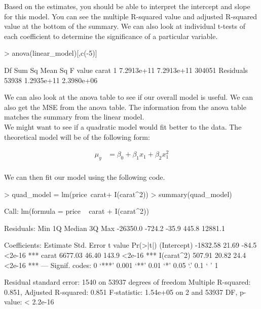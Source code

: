 \documentclass{article}
\begin{document}
Based on the estimates, you should be able to interpret the intercept and slope for this model.  You can see the multiple R-squared value and adjusted R-squared value at the bottom of the summary.  We can also look at individual t-tests of each coefficient to determine the significance of a particular variable.

\begin{Schunk}
\begin{Sinput}
> anova(linear_model)[,c(-5)]
\end{Sinput}
\begin{Soutput}
             Df     Sum Sq    Mean Sq F value
carat         1 7.2913e+11 7.2913e+11  304051
Residuals 53938 1.2935e+11 2.3980e+06        
\end{Soutput}
\end{Schunk}

We can also look at the anova table to see if our overall model is useful.  We can also get the MSE from the anova table.  The information from the anova table matches the summary from the linear model.\\[.25cm]

We might want to see if a quadratic model would fit better to the data. The theoretical model will be of the following form: 

\begin{eqnarray*}
\mu_y&=\beta_0 + \beta_1 x_1 + \beta_2 x_1^2 \\
\end{eqnarray*}

We can then fit our model using the following code.  

\begin{Schunk}
\begin{Sinput}
> quad_model = lm(price~carat+ I(carat^2))
> summary(quad_model)
\end{Sinput}
\begin{Soutput}
Call:
lm(formula = price ~ carat + I(carat^2))

Residuals:
     Min       1Q   Median       3Q      Max 
-26350.0   -724.2    -35.9    445.8  12881.1 

Coefficients:
            Estimate Std. Error t value Pr(>|t|)    
(Intercept) -1832.58      21.69   -84.5   <2e-16 ***
carat        6677.03      46.40   143.9   <2e-16 ***
I(carat^2)    507.91      20.82    24.4   <2e-16 ***
---
Signif. codes:  0 ‘***’ 0.001 ‘**’ 0.01 ‘*’ 0.05 ‘.’ 0.1 ‘ ’ 1

Residual standard error: 1540 on 53937 degrees of freedom
Multiple R-squared:  0.851,	Adjusted R-squared:  0.851 
F-statistic: 1.54e+05 on 2 and 53937 DF,  p-value: < 2.2e-16
\end{Soutput}
\end{Schunk}
\end{document}
